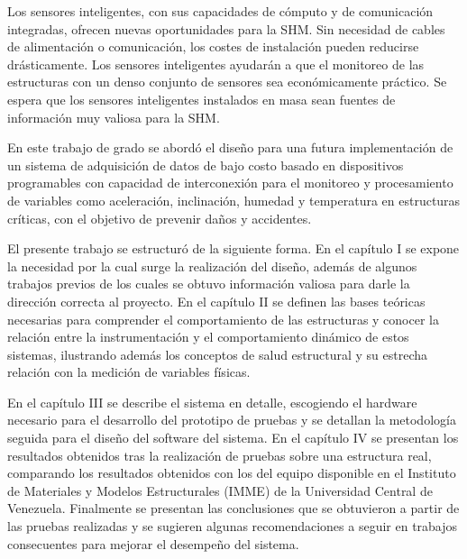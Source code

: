 Los sensores inteligentes, con sus capacidades de cómputo y de comunicación integradas, ofrecen nuevas oportunidades para la SHM. Sin necesidad de cables de alimentación o comunicación, los costes de instalación pueden reducirse drásticamente. Los sensores inteligentes ayudarán a que el monitoreo de las estructuras con un denso conjunto de sensores sea económicamente práctico. Se espera que los sensores inteligentes instalados en masa sean fuentes de información muy valiosa para la SHM.

En este trabajo de grado se abordó el diseño para una futura implementación de un sistema de adquisición de datos de bajo costo basado en dispositivos programables con capacidad de interconexión para el monitoreo y procesamiento de variables como aceleración, inclinación, humedad y temperatura en estructuras críticas, con el objetivo de prevenir daños y accidentes.

El presente trabajo se estructuró de la siguiente forma. En el capítulo I se expone la necesidad por la cual surge la realización del diseño, además de algunos trabajos previos de los cuales se obtuvo información valiosa para darle la dirección correcta al proyecto. En el capítulo II se definen las bases teóricas necesarias para comprender el comportamiento de las estructuras y conocer la relación entre la instrumentación y el comportamiento dinámico de estos sistemas, ilustrando además los conceptos de salud estructural y su estrecha relación con la medición de variables físicas.

En el capítulo III se describe el sistema en detalle, escogiendo el hardware necesario para el desarrollo del prototipo de pruebas y se detallan la metodología seguida para el diseño del software del sistema. En el capítulo IV se presentan los resultados obtenidos tras la realización de pruebas sobre una estructura real, comparando los resultados obtenidos con los del equipo disponible en el Instituto de Materiales y Modelos Estructurales (IMME) de la Universidad Central de Venezuela. Finalmente se presentan las conclusiones que se obtuvieron a partir de las pruebas realizadas y se sugieren algunas recomendaciones a seguir en trabajos consecuentes para mejorar el desempeño del sistema.
